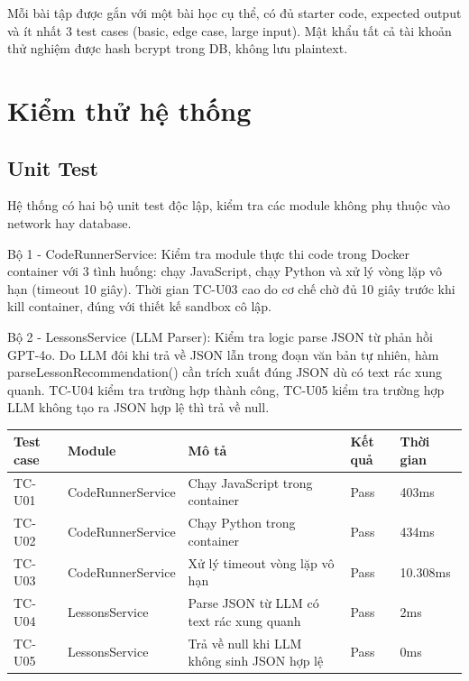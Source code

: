 \documentclass[../main.tex]{subfiles}
\begin{document}
Mỗi bài tập được gắn với một bài học cụ thể, có đủ starter code, expected output và ít nhất 3 test cases (basic, edge case, large input). Mật khẩu tất cả tài khoản thử nghiệm được hash bcrypt trong DB, không lưu plaintext.

\section{Kiểm thử hệ thống}

\subsection{Unit Test}

Hệ thống có hai bộ unit test độc lập, kiểm tra các module không phụ thuộc vào network hay database.

Bộ 1 - CodeRunnerService: Kiểm tra module thực thi code trong Docker container với 3 tình huống: chạy JavaScript, chạy Python và xử lý vòng lặp vô hạn (timeout 10 giây). Thời gian TC-U03 cao do cơ chế chờ đủ 10 giây trước khi kill container, đúng với thiết kế sandbox cô lập.

Bộ 2 - LessonsService (LLM Parser): Kiểm tra logic parse JSON từ phản hồi GPT-4o. Do LLM đôi khi trả về JSON lẫn trong đoạn văn bản tự nhiên, hàm parseLessonRecommendation() cần trích xuất đúng JSON dù có text rác xung quanh. TC-U04 kiểm tra trường hợp thành công, TC-U05 kiểm tra trường hợp LLM không tạo ra JSON hợp lệ thì trả về null.


{
\renewcommand{\arraystretch}{1.5}
\begin{tabularx}{\textwidth}{|p{2.0cm}|p{4cm}|X|p{2.0cm}|p{2.0cm}|}
\caption{Kết quả Unit Test}
\label{tab:ket-qua-unit-test}
\\
\hline
\textbf{Test case} & \textbf{Module} & \textbf{Mô tả} & \textbf{Kết quả} & \textbf{Thời gian} \\
\hline
TC-U01 & CodeRunnerService & Chạy JavaScript trong container & Pass & 403ms \\
\hline
TC-U02 & CodeRunnerService & Chạy Python trong container & Pass & 434ms \\
\hline
TC-U03 & CodeRunnerService & Xử lý timeout vòng lặp vô hạn & Pass & 10.308ms \\
\hline
TC-U04 & LessonsService & Parse JSON từ LLM có text rác xung quanh & Pass & 2ms \\
\hline
TC-U05 & LessonsService & Trả về null khi LLM không sinh JSON hợp lệ & Pass & 0ms \\
\hline
\end{tabularx}
}
\end{document}

